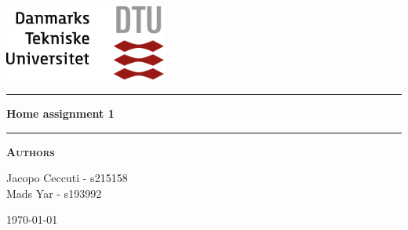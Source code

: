 
\begin{titlepage}
\begin{center}
\vspace{2cm}
\includegraphics[width=0.4\textwidth]{root/dtu.png}~\\[1cm]
\vspace{2cm}

\vspace{2cm}

\hrule
\vspace{.5cm}
{ \huge \bfseries Home assignment 1 } %
\vspace{.5cm}

\hrule
\vspace{1.5cm}

\textsc{\textbf{Authors}}\\
\vspace{.5cm}
\centering

Jacopo Ceccuti - s215158\\
Mads Yar - s193992\\

\vspace{4cm}

\centering \today %
\end{center}
\end{titlepage}
